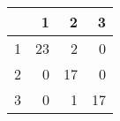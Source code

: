 \begin{tabular}{rrrr}
  \hline
 & 1 & 2 & 3 \\ 
  \hline
1 &  23 &   2 &   0 \\ 
  2 &   0 &  17 &   0 \\ 
  3 &   0 &   1 &  17 \\ 
   \hline
\end{tabular}
